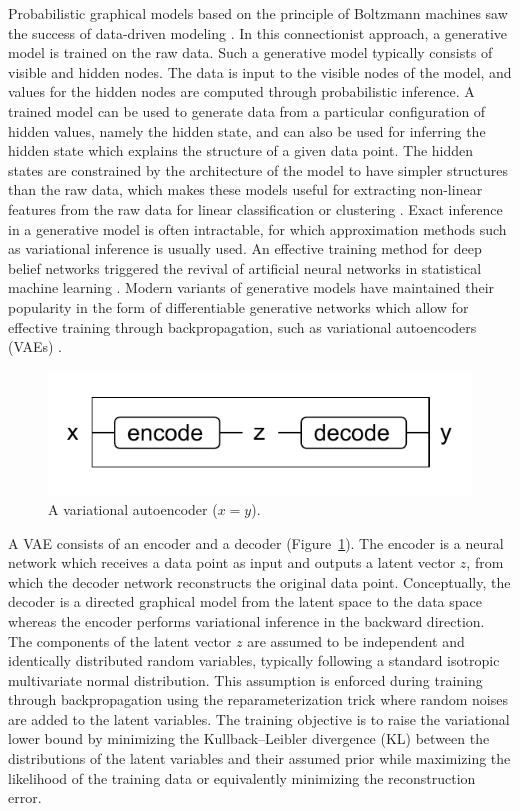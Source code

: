 \documentclass[11pt]{article}
\begin{document}
Probabilistic graphical models based on the principle of Boltzmann machines
saw the success of data-driven modeling \parencite{ackley1985learning}.
In this connectionist approach, a generative model is trained on the raw data.
Such a generative model typically consists of visible and hidden nodes.
The data is input to the visible nodes of the model,
and values for the hidden nodes are computed through probabilistic inference.
A trained model can be used to generate data from a particular configuration of hidden values, namely the hidden state,
and can also be used for inferring the hidden state which explains the structure of a given data point.
The hidden states are constrained by the architecture of the model to have simpler structures than the raw data,
which makes these models useful for extracting non-linear features from the raw data
for linear classification or clustering \parencite{hinton2006reducing}.
Exact inference in a generative model is often intractable,
for which approximation methods such as variational inference is usually used.
An effective training method for deep belief networks triggered the revival of artificial neural networks
in statistical machine learning \parencite{hinton2006fast}.
Modern variants of generative models have maintained their popularity
in the form of differentiable generative networks which allow for effective training through backpropagation,
such as variational autoencoders (VAEs) \parencite{kingma2013auto}.

\begin{figure}
  \centering\includegraphics[width=0.7\linewidth]{vae.pdf}
  \caption[]{\label{fig:vae}A variational autoencoder (\(x = y\)).}
\end{figure}

A VAE consists of an encoder and a decoder (Figure~\ref{fig:vae}).
The encoder is a neural network which receives a data point as input and outputs a latent vector \(z\),
from which the decoder network reconstructs the original data point.
Conceptually, the decoder is a directed graphical model from the latent space to the data space
whereas the encoder performs variational inference in the backward direction.
The components of the latent vector \(z\) are assumed to be independent and identically distributed random variables,
typically following a standard isotropic multivariate normal distribution.
This assumption is enforced during training through backpropagation using the reparameterization trick
where random noises are added to the latent variables.
The training objective is to raise the variational lower bound
by minimizing the Kullback–Leibler divergence (KL) between the distributions
of the latent variables and their assumed prior
while maximizing the likelihood of the training data
or equivalently minimizing the reconstruction error.
\end{document}
